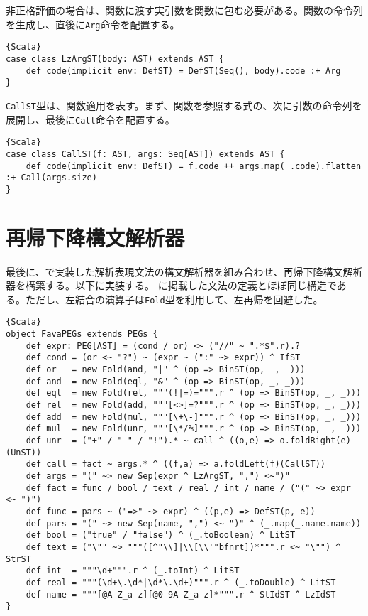 \documentclass[10pt,a4paper]{book}
\begin{document}
非正格評価の場合は、関数に渡す実引数を関数に包む必要がある。関数の命令列を生成し、直後に\texttt{Arg}命令を配置する。

\begin{Verbatim}{Scala}
case class LzArgST(body: AST) extends AST {
	def code(implicit env: DefST) = DefST(Seq(), body).code :+ Arg
}
\end{Verbatim}

\texttt{CallST}型は、関数適用を表す。まず、関数を参照する式の、次に引数の命令列を展開し、最後に\texttt{Call}命令を配置する。

\begin{Verbatim}{Scala}
case class CallST(f: AST, args: Seq[AST]) extends AST {
	def code(implicit env: DefST) = f.code ++ args.map(_.code).flatten :+ Call(args.size)
}
\end{Verbatim}

\section{再帰下降構文解析器}

最後に、で実装した解析表現文法の構文解析器を組み合わせ、再帰下降構文解析器を構築する。以下に実装する。
に掲載した文法の定義とほぼ同じ構造である。ただし、左結合の演算子は\texttt{Fold}型を利用して、左再帰を回避した。

\begin{Verbatim}{Scala}
object FavaPEGs extends PEGs {
	def expr: PEG[AST] = (cond / or) <~ ("//" ~ ".*$".r).?
	def cond = (or <~ "?") ~ (expr ~ (":" ~> expr)) ^ IfST
	def or   = new Fold(and, "|" ^ (op => BinST(op, _, _)))
	def and  = new Fold(eql, "&" ^ (op => BinST(op, _, _)))
	def eql  = new Fold(rel, """(!|=)=""".r ^ (op => BinST(op, _, _)))
	def rel  = new Fold(add, """[<>]=?""".r ^ (op => BinST(op, _, _)))
	def add  = new Fold(mul, """[\+\-]""".r ^ (op => BinST(op, _, _)))
	def mul  = new Fold(unr, """[\*/%]""".r ^ (op => BinST(op, _, _)))
	def unr  = ("+" / "-" / "!").* ~ call ^ ((o,e) => o.foldRight(e)(UnST))
	def call = fact ~ args.* ^ ((f,a) => a.foldLeft(f)(CallST))
	def args = "(" ~> new Sep(expr ^ LzArgST, ",") <~")"
	def fact = func / bool / text / real / int / name / ("(" ~> expr <~ ")")
	def func = pars ~ ("=>" ~> expr) ^ ((p,e) => DefST(p, e))
	def pars = "(" ~> new Sep(name, ",") <~ ")" ^ (_.map(_.name.name))
	def bool = ("true" / "false") ^ (_.toBoolean) ^ LitST
	def text = ("\"" ~> """([^"\\]|\\[\\'"bfnrt])*""".r <~ "\"") ^ StrST
	def int  = """\d+""".r ^ (_.toInt) ^ LitST
	def real = """(\d+\.\d*|\d*\.\d+)""".r ^ (_.toDouble) ^ LitST
	def name = """[@A-Z_a-z][@0-9A-Z_a-z]*""".r ^ StIdST ^ LzIdST
}
\end{Verbatim}
\end{document}
